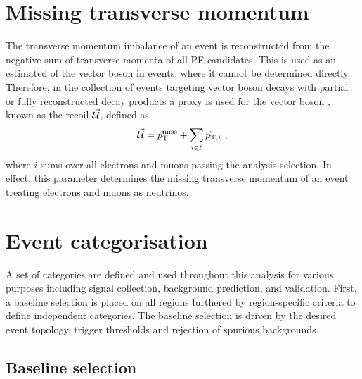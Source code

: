 \section{Missing transverse momentum}

The transverse momentum imbalance of an event is reconstructed from the negative sum of transverse momenta of all PF candidates. This is used as an estimated of the vector boson \pt in \IZvvj events, where it cannot be determined directly. Therefore, in the collection of events targeting vector boson decays with partial or fully reconstructed decay products a proxy is used for the vector boson \vecpt, known as the recoil $\vec{\mathcal{U}}$, defined as
%
\begin{equation}
    \vec{\mathcal{U}} = \vec{p}_{\mathrm{T}}^{\mathrm{miss}} + \sum_{i\in\ell} \vec{p}_{\mathrm{T},i}\ ,
\end{equation}
%
where $i$ sums over all electrons and muons passing the analysis selection. In effect, this parameter determines the missing transverse momentum of an event treating electrons and muons as neutrinos.


\section{Event categorisation}

A set of categories are defined and used throughout this analysis for various purposes including signal collection, background prediction, and validation.  First, a baseline selection is placed on all regions furthered by region-specific criteria to define independent categories. The baseline selection is driven by the desired event topology, trigger thresholds and rejection of spurious \ptmiss backgrounds.


\subsection{Baseline selection}\label{sec:baseline-selection}

